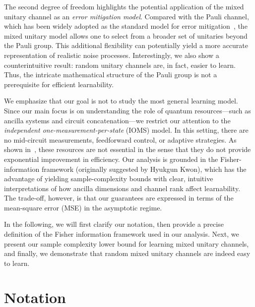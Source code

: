 \documentclass[12pt]{article}
\begin{document}
The second degree of freedom highlights the potential application of the mixed unitary channel as an \emph{error mitigation model}. Compared with the Pauli channel, which has been widely adopted as the standard model for error mitigation~\cite{cai2023qem}, the mixed unitary model allows one to select from a broader set of unitaries beyond the Pauli group. This additional flexibility can potentially yield a more accurate representation of realistic noise processes. Interestingly, we also show a counterintuitive result: random unitary channels are, in fact, easier to learn. Thus, the intricate mathematical structure of the Pauli group is not a prerequisite for efficient learnability.

We emphasize that our goal is not to study the most general learning model. Since our main focus is on understanding the role of quantum resources---such as ancilla systems and circuit concatenation---we restrict our attention to the \emph{independent one-measurement-per-state} (IOMS) model. In this setting, there are no mid-circuit measurements, feedforward control, or adaptive strategies. As shown in~\cite{chen2024tight}, these resources are not essential in the sense that they do not provide exponential improvement in efficiency. Our analysis is grounded in the Fisher-information framework (originally suggested by Hyukgun Kwon), which has the advantage of yielding sample-complexity bounds with clear, intuitive interpretations of how ancilla dimensions and channel rank affect learnability. The trade-off, however, is that our guarantees are expressed in terms of the mean-square error (MSE) in the asymptotic regime.

In the following, we will first clarify our notation, then provide a precise definition of the Fisher information framework used in our analysis. Next, we present our sample complexity lower bound for learning mixed unitary channels, and finally, we demonstrate that random mixed unitary channels are indeed easy to learn.

\section{Notation}
\end{document}
